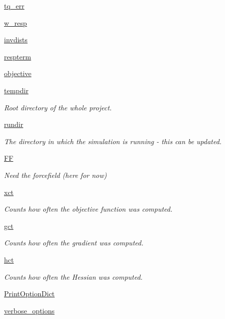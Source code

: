 \begin{DoxyCompactItemize}
\hyperlink{classforcebalance_1_1abinitio_1_1AbInitio_a36857e469f48d8bddbd3b288a92cac10}{tq\-\_\-err}
\item 
\hyperlink{classforcebalance_1_1abinitio_1_1AbInitio_ab949767e48e84f747f0e84c304d80004}{w\-\_\-resp}
\item 
\hyperlink{classforcebalance_1_1abinitio_1_1AbInitio_ac90a96916a049717e14bc1f757577f24}{invdists}
\item 
\hyperlink{classforcebalance_1_1abinitio_1_1AbInitio_ac4f8e85daeccb2e46b724eddc76d38e1}{respterm}
\item 
\hyperlink{classforcebalance_1_1abinitio_1_1AbInitio_ae27974d01fbc7d485ce3e049a54943bc}{objective}
\item 
\hyperlink{classforcebalance_1_1target_1_1Target_aede2856573b890cd47054ad36937d6f6}{tempdir}
\begin{DoxyCompactList}\small\item\em \-Root directory of the whole project. \end{DoxyCompactList}\item 
\hyperlink{classforcebalance_1_1target_1_1Target_a1da470037ef61c22dc44beb85cfa01a9}{rundir}
\begin{DoxyCompactList}\small\item\em \-The directory in which the simulation is running -\/ this can be updated. \end{DoxyCompactList}\item 
\hyperlink{classforcebalance_1_1target_1_1Target_a796dc30a19a60c63fb43b088d40a963f}{\-F\-F}
\begin{DoxyCompactList}\small\item\em \-Need the forcefield (here for now) \end{DoxyCompactList}\item 
\hyperlink{classforcebalance_1_1target_1_1Target_ad4cd0ab38d8fc97d3e7a6e22ce130a16}{xct}
\begin{DoxyCompactList}\small\item\em \-Counts how often the objective function was computed. \end{DoxyCompactList}\item 
\hyperlink{classforcebalance_1_1target_1_1Target_aff6e42b84dd8eb5a4dc3b47aa58bc64c}{gct}
\begin{DoxyCompactList}\small\item\em \-Counts how often the gradient was computed. \end{DoxyCompactList}\item 
\hyperlink{classforcebalance_1_1target_1_1Target_ae929918b7e695a99d7ec946d06d793e1}{hct}
\begin{DoxyCompactList}\small\item\em \-Counts how often the \-Hessian was computed. \end{DoxyCompactList}\item 
\hyperlink{classforcebalance_1_1BaseClass_afc6659278497d7245bc492ecf405ccae}{\-Print\-Option\-Dict}
\item 
\hyperlink{classforcebalance_1_1BaseClass_afd68efa29ccd2f320f4cf82198214aac}{verbose\-\_\-options}
\end{DoxyCompactItemize}


